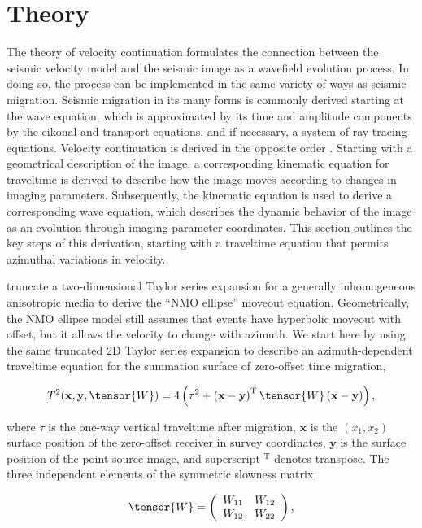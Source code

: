 \section{Theory}
The theory of velocity continuation formulates the connection between the seismic velocity model and the seismic image as a wavefield evolution process. 
In doing so, the process can be implemented in the same variety of ways as seismic migration. 
Seismic migration in its many forms is commonly derived starting at the wave equation, which is approximated by its time and amplitude components by the eikonal and transport equations, and if necessary, a system of ray tracing equations. 
Velocity continuation is derived in the opposite order \cite[]{GEO68-05-16501661}. 
Starting with a geometrical description of the image, a corresponding kinematic equation for traveltime is derived to describe how the image moves according to changes in imaging parameters. 
Subsequently, the kinematic equation is used to derive a corresponding wave equation, which describes the dynamic behavior of the image as an evolution through imaging parameter coordinates. 
This section outlines the key steps of this derivation, starting with a traveltime equation that permits azimuthal variations in velocity. 

\cite{GEO63-03-10791092} truncate a two-dimensional Taylor series expansion for a generally inhomogeneous anisotropic media to derive the ``NMO ellipse'' moveout equation. Geometrically, the NMO ellipse model still assumes that events have
hyperbolic moveout with offset, but it allows the velocity to change
with azimuth.  We start here by using the same truncated 2D Taylor
series expansion to describe an azimuth-dependent traveltime equation
for the summation surface of zero-offset time migration,

\begin{equation}
\label{eq:TofW}
T^2(\mathbf{x},\mathbf{y},\tensor{W})=4\left(\tau ^2+\left( \mathbf{x}-\mathbf{y}\right) ^{\mathrm{T}}\tensor{W}\left( \mathbf{x}-\mathbf{y}\right) \right),
\end{equation}

\noindent where $\tau $ is the one-way vertical traveltime after migration, $\mathbf{x}$ is the $(x_1,x_2)$ surface position of the zero-offset receiver in survey coordinates, $\mathbf{y}$ is the surface position of the point source image, and superscript ${}^{\mathrm{T}}$ denotes transpose.  
The three independent elements of the symmetric slowness matrix,

\begin{equation}
\label{eq:Wmatrix}
\tensor{W}=\left(
\begin{array}{cc}
 W_{11} & W_{12} \\
 W_{12} & W_{22}
\end{array}
\right),
\end{equation}

